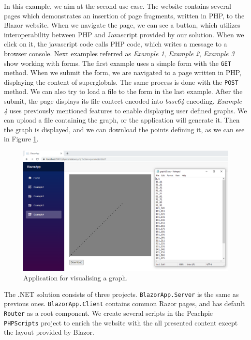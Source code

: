 In this example, we aim at the second use case.
The website contains several pages which demonstrates an insertion of page fragments, written in PHP, to the Blazor website.
When we navigate the page, we can see a button, which utilizes interoperability between PHP and Javascript provided by our solution.
When we click on it, the javascript code calls PHP code, which writes a message to a browser console.
Next examples referred as \textit{Example 1}, \textit{Example 2}, \textit{Example 3} show working with forms.
The first example uses a simple form with the \texttt{GET} method.
When we submit the form, we are navigated to a page written in PHP, displaying the content of superglobals.
The same process is done with the \texttt{POST} method.
We can also try to load a file to the form in the last example.
After the submit, the page displays its file contect encoded into \textit{base64} encoding.
\textit{Example 4} uses previously mentioned features to enable displaying user defined graphs.
We can upload a file containing the graph, or the application will generate it.
Then the graph is displayed, and we can download the points defining it, as we can see in Figure \ref{img27:graph}.
\par
\begin{figure}\centering
\includegraphics[scale=0.4]{./img/graph}
\caption{Application for visualising a graph.}
\label{img27:graph}
\end{figure} 
\par
The .NET solution consists of three projects.
\texttt{BlazorApp.Server} is the same as previous ones.
\texttt{BlazorApp.Client} contains common Razor pages, and has default \texttt{Router} as a root component.
We create several scripts in the Peachpie \texttt{PHPScripts} project to enrich the website with the all presented content except the layout provided by Blazor.
